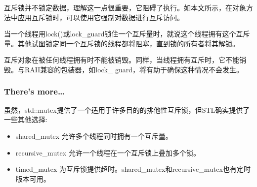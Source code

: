 互斥锁并不锁定数据，理解这一点很重要，它阻碍了执行。如本文所示，在对象方法中应用互斥锁时，可以使用它强制对数据进行互斥访问。

当一个线程用lock()或lock\_guard锁住一个互斥量时，就说这个线程拥有这个互斥量。其他试图锁定同一个互斥锁的线程都将阻塞，直到锁的所有者将其解锁。

互斥对象在被任何线程拥有时不能被销毁。同样，当线程拥有互斥时，它不能销毁。与RAII兼容的包装器，如lock\_ guard，将有助于确保这种情况不会发生。

\subsubsection{There's more…}

虽然，std::mutex提供了一个适用于许多目的的排他性互斥锁，但STL确实提供了一些其他选择:

\begin{itemize}
\item 
shared\_mutex 允许多个线程同时拥有一个互斥量。

\item 
recursive\_mutex 允许一个线程在一个互斥锁上叠加多个锁。

\item 
timed\_mutex 为互斥锁提供超时。shared\_mutex和recursive\_mutex也有定时版本可用。
\end{itemize}












